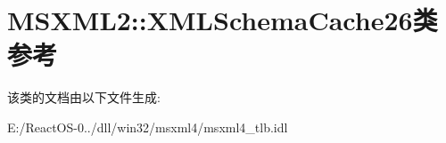 \hypertarget{class_m_s_x_m_l2_1_1_x_m_l_schema_cache26}{}\section{M\+S\+X\+M\+L2\+:\+:X\+M\+L\+Schema\+Cache26类 参考}
\label{class_m_s_x_m_l2_1_1_x_m_l_schema_cache26}


该类的文档由以下文件生成\+:\begin{DoxyCompactItemize}
\item 
E\+:/\+React\+O\+S-\/0../dll/win32/msxml4/msxml4\+\_\+tlb.\+idl\end{DoxyCompactItemize}
